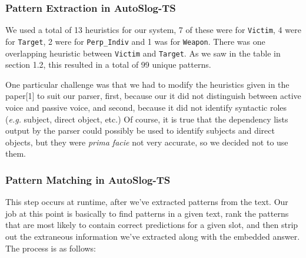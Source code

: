 \documentclass[11pt]{myclass}
\begin{document}
\subsubsection{Pattern Extraction in AutoSlog-TS}

We used a total of 13 heuristics for our system, 7 of these were for \texttt{Victim}, 4 were for \texttt{Target}, 2 were for \texttt{Perp\_Indiv} and 1 was for \texttt{Weapon}. There was one overlapping heuristic between \texttt{Victim} and \texttt{Target}. As we saw in the table in section 1.2, this resulted in a total of 99 unique patterns.

One particular challenge was that we had to modify the heuristics given in the paper[1] to suit our parser, first, because our it did not distinguish between active voice and passive voice, and second, because it did not identify syntactic roles (\textit{e.g.} subject, direct object, etc.) Of course, it is true that the dependency lists output by the parser could possibly be used to identify subjects and direct objects, but they were \textit{prima facie} not very accurate, so we decided not to use them.

\subsubsection{Pattern Matching in AutoSlog-TS}

This step occurs at runtime, after we've extracted patterns from the text. Our job at this point is basically to find patterns in a given text, rank the patterns that are most likely to contain correct predictions for a given slot, and then strip out the extraneous information we've extracted along with the embedded answer. The process is as follows:
\end{document}
